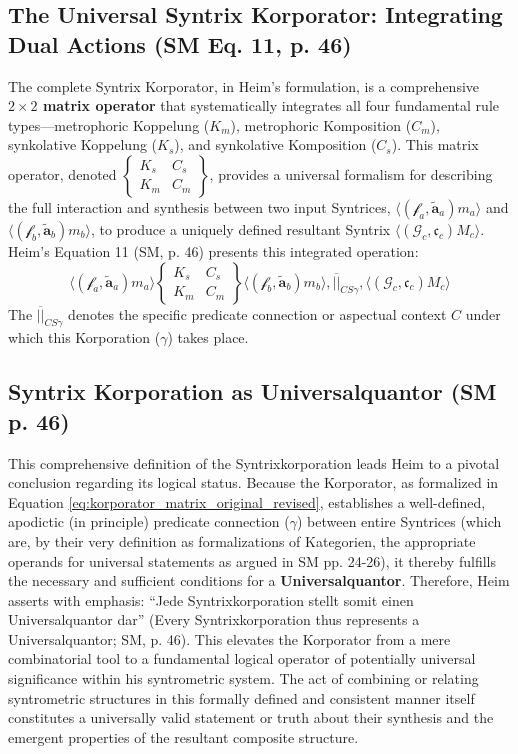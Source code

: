 \documentclass[
    12pt,              %
    a4paper,           %
    headings=normal,   %
    twoside=true,      %
    BCOR=8mm,          %
]{scrbook}
\newcommand{\q}[1]{\enquote{#1}}
\newcommand{\metrophor}{\bm{\widetilde{a}}}
\newcommand{\synkolator}{\mathcal{f}}
\newcommand{\synkolationsstufe}{m}
\newcommand{\korporatoroperator}{\begin{Bmatrix} K_s & C_s \\ K_m & C_m \end{Bmatrix}}
\begin{document}
\subsection{The Universal Syntrix Korporator: Integrating Dual Actions (SM Eq. 11, p. 46)}
\label{sec:ch3_universal_korporator_matrix} 

The complete Syntrix Korporator, in Heim's formulation, is a comprehensive \textbf{\(2 \times 2\) matrix operator} that systematically integrates all four fundamental rule types—metrophoric Koppelung (\(K_m\)), metrophoric Komposition (\(C_m\)), synkolative Koppelung (\(K_s\)), and synkolative Komposition (\(C_s\)). This matrix operator, denoted \(\korporatoroperator\), provides a universal formalism for describing the full interaction and synthesis between two input Syntrices, \(\langle (\synkolator_a, \metrophor_a) \synkolationsstufe_a \rangle\) and \(\langle (\synkolator_b, \metrophor_b) \synkolationsstufe_b \rangle\), to produce a uniquely defined resultant Syntrix \(\langle (\mathcal{G}_c, \mathfrak{c}_c) M_c \rangle\). Heim's Equation 11 (SM, p. 46) presents this integrated operation:
\begin{equation} \label{eq:korporator_matrix_original} %
\langle (\synkolator_a, \metrophor_a) \synkolationsstufe_a \rangle \korporatoroperator \langle (\synkolator_b, \metrophor_b) \synkolationsstufe_b \rangle, \overline{||}_{CS\gamma}, \langle (\mathcal{G}_c, \mathfrak{c}_c) M_c \rangle
\end{equation}
The \( \overline{||}_{CS\gamma} \) denotes the specific predicate connection or aspectual context \(C\) under which this Korporation (\(\gamma\)) takes place.

\subsection{Syntrix Korporation as Universalquantor (SM p. 46)}
\label{sec:ch3_korporation_as_universalquantor_original} 

This comprehensive definition of the Syntrixkorporation leads Heim to a pivotal conclusion regarding its logical status. Because the Korporator, as formalized in Equation \eqref{eq:korporator_matrix_original_revised}, establishes a well-defined, apodictic (in principle) predicate connection (\(\gamma\)) between entire Syntrices (which are, by their very definition as formalizations of Kategorien, the appropriate operands for universal statements as argued in SM pp. 24-26), it thereby fulfills the necessary and sufficient conditions for a \textbf{Universalquantor}. Therefore, Heim asserts with emphasis: \q{Jede Syntrixkorporation stellt somit einen Universalquantor dar} (Every Syntrixkorporation thus represents a Universalquantor; SM, p. 46). This elevates the Korporator from a mere combinatorial tool to a fundamental logical operator of potentially universal significance within his syntrometric system. The act of combining or relating syntrometric structures in this formally defined and consistent manner itself constitutes a universally valid statement or truth about their synthesis and the emergent properties of the resultant composite structure.
\end{document}
